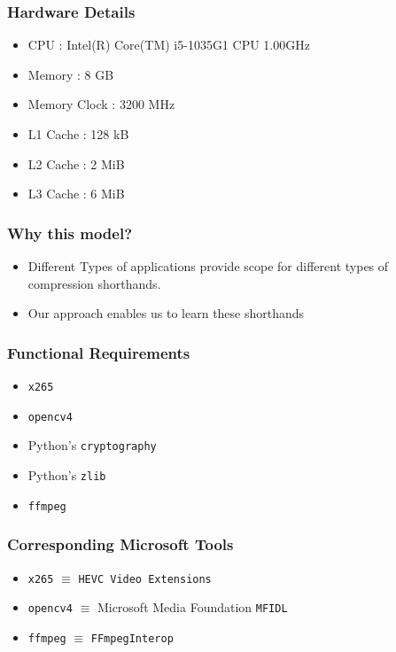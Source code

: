 \documentclass{beamer}
\begin{document}
\begin{frame}
    \frametitle{Hardware Details}
    \begin{itemize}
        \item CPU : Intel(R) Core(TM) i5-1035G1 CPU \@ 1.00GHz

        \item Memory : 8 GB
        \item Memory Clock : 3200 MHz
        \item L1 Cache : 128 kB
        \item L2 Cache : 2 MiB
        \item L3 Cache : 6 MiB
    \end{itemize}
\end{frame}

\begin{frame}
    \frametitle{Why this model?}
    \begin{itemize}
        \item Different Types of applications provide scope for different types of compression shorthands.
        \item Our approach enables us to learn these shorthands
    \end{itemize}
\end{frame}

\begin{frame}
    \frametitle{Functional Requirements}
    \begin{itemize}
        \item \texttt{x265}
        \item \texttt{opencv4}
        \item Python's \texttt{cryptography}
        \item Python's \texttt{zlib}
        \item \texttt{ffmpeg}
    \end{itemize}
\end{frame}

\begin{frame}
    \frametitle{Corresponding Microsoft Tools}
    \begin{itemize}
        \item \texttt{x265} $\equiv$ \texttt{HEVC Video Extensions}
        \item \texttt{opencv4} $\equiv$ Microsoft Media Foundation \texttt{MFIDL}
        \item \texttt{ffmpeg} $\equiv$ \texttt{FFmpegInterop}
    \end{itemize}
\end{frame}
\end{document}

